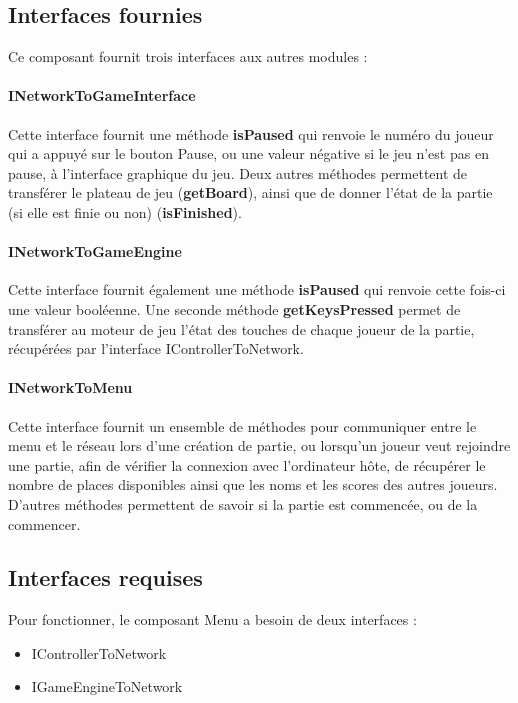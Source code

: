 \subsection{Interfaces fournies}

Ce composant fournit trois interfaces aux autres modules :

\paragraph{INetworkToGameInterface}

Cette interface fournit une méthode \textbf{isPaused} qui renvoie le numéro du joueur qui a appuyé sur le bouton Pause, ou une valeur négative si le jeu n'est pas en pause, à l'interface graphique du jeu. Deux autres méthodes permettent de transférer le plateau de jeu (\textbf{getBoard}), ainsi que de donner l'état de la partie (si elle est finie ou non) (\textbf{isFinished}).

\paragraph{INetworkToGameEngine}

Cette interface fournit également une méthode \textbf{isPaused} qui renvoie cette fois-ci une valeur booléenne. Une seconde méthode \textbf{getKeysPressed} permet de transférer au moteur de jeu l'état des touches de chaque joueur de la partie, récupérées par l'interface IControllerToNetwork.

\paragraph{INetworkToMenu}

Cette interface fournit un ensemble de méthodes pour communiquer entre le menu et le réseau lors d'une création de partie, ou lorsqu'un joueur veut rejoindre une partie, afin de vérifier la connexion avec l'ordinateur hôte, de récupérer le nombre de places disponibles ainsi que les noms et les scores des autres joueurs. D'autres méthodes permettent de savoir si la partie est commencée, ou de la commencer.

\subsection{Interfaces requises}

Pour fonctionner, le composant Menu a besoin de deux interfaces :
\begin{itemize}
    \item IControllerToNetwork
    \item IGameEngineToNetwork 
\end{itemize}

